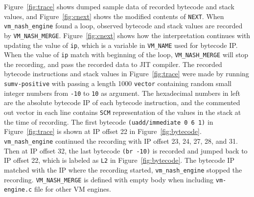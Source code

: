 \documentclass[preprint, 10pt]{sigplanconf}
\begin{document}
Figure~\hyperref[fig:trace]{\ref{fig:trace}} shows dumped sample data of
recorded bytecode and stack values, and
Figure~\hyperref[fig:cnext]{\ref{fig:cnext}} shows the modified contents of
\texttt{NEXT}. When \texttt{vm\_nash\_engine} found a loop, observed bytecode
and stack values are recorded by
\texttt{VM\_NASH\_MERGE}. Figure~\hyperref[fig:cnext]{\ref{fig:cnext}} shows how
the interpretation continues with updating the value of \texttt{ip}, which is a
variable in \texttt{VM\_NAME} used for bytecode IP. When the value of
\texttt{ip} match with beginning of the loop, \texttt{VM\_NASH\_MERGE} will stop
the recording, and pass the recorded data to JIT compiler. The recorded bytecode
instructions and stack values in Figure~\hyperref[fig:trace]{\ref{fig:trace}}
were made by running \texttt{sumv-positive} with passing a length 1000
\texttt{vector} containing random small integer numbers from \texttt{-10} to
\texttt{10} as argument. The hexadecimal numbers in left are the absolute
bytecode IP of each bytecode instruction, and the commented out vector in each
line contains \texttt{SCM} representation of the values in the stack at the time
of recording.  The first bytecode \texttt{(uadd/immediate 0 6 1)} in
Figure~\hyperref[fig:trace]{\ref{fig:trace}} is shown at IP offset 22 in
Figure~\hyperref[fig:bytecode]{\ref{fig:bytecode}}. \texttt{vm\_nash\_engine}
continued the recording with IP offset 23, 24, 27, 28, and 31. Then at IP offset
32, the last bytecode \texttt{(br -10)} is recorded and jumped back to IP offset
22, which is labeled as \texttt{L2} in
Figure~\hyperref[fig:bytecode]{\ref{fig:bytecode}}. The bytecode IP matched with
the IP where the recording started, \texttt{vm\_nash\_engine} stopped the
recording. \texttt{VM\_NASH\_MERGE} is defined with empty body when including
\texttt{vm-engine.c} file for other VM engines.

\end{document}
